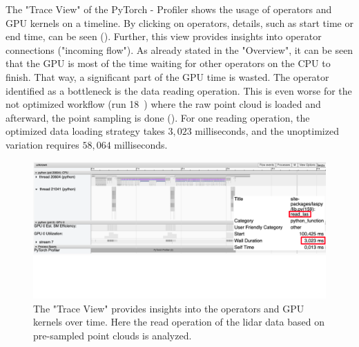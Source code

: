\documentclass[12pt, a4paper, hidelinks]{article}
\begin{document}
The "Trace View" of the PyTorch - Profiler shows the usage of operators and GPU kernels on a timeline. By clicking on operators, details, such as start time or end time, can be seen (). Further, this view provides insights into operator connections ("incoming flow").
As already stated in the "Overview", it can be seen that the GPU is most of the time waiting for other operators on the CPU to finish. That way, a significant part of the GPU time is wasted. The operator identified as a bottleneck is the data reading operation. This is even worse for the not optimized workflow (run 18~) where the raw point cloud is loaded and afterward, the point sampling is done (). For one reading operation, the optimized data loading strategy takes $3,023$ milliseconds, and the unoptimized variation requires $58,064$ milliseconds.

\begin{figure}[H]
\centering
\includegraphics[width=1\textwidth]{./assets/scap_gtx1080_profiler-torch_batch-size-64_14650758_trace-view-laspy}
\caption[PyTorch - Profiler: Trace View]{The "Trace View" provides insights into the operators and GPU kernels over time. Here the read operation of the lidar data based on pre-sampled point clouds is analyzed.}
\label{fig:scap_gtx1080_profiler-torch_batch-size-64_14650758_trace-view-laspy}
\end{figure}
\end{document}
